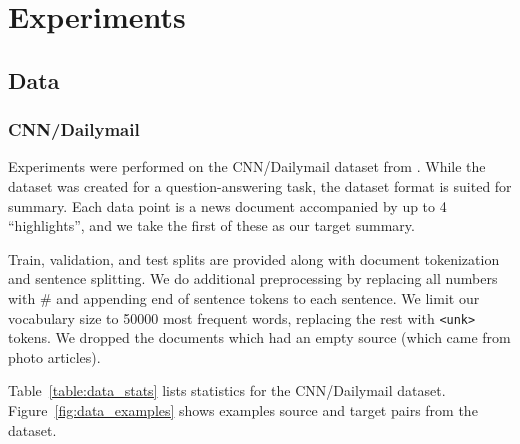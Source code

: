 \documentclass[12pt]{report}
\begin{document}
%
%

%


\chapter{Experiments}
\label{chap:experiments}

\section{Data}

\subsection{CNN/Dailymail}

Experiments were performed on the CNN/Dailymail dataset from \cite{Hermann2015}.
While the dataset was created for a question-answering task, the dataset format is suited for summary. Each data point is a news document accompanied by up to 4 ``highlights'', and we take the first of these as our target summary.



Train, validation, and test splits are provided along with document tokenization and sentence splitting. We do additional preprocessing by replacing all numbers with \# and appending end of sentence tokens to each sentence. We limit our vocabulary size to 50000 most frequent words, replacing the rest with \texttt{<unk>} tokens. We dropped the documents which had an empty source (which came from photo articles).

 Table~\ref{table:data_stats} lists statistics for the CNN/Dailymail dataset. Figure~\ref{fig:data_examples} shows examples source and target pairs from the dataset.
\end{document}
